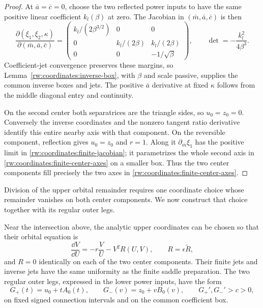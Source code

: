 \begin{proof}
At $\bar a=\bar c=0$, choose the two reflected power inputs to
have the same positive linear coefficient $k_l(\beta)$ at zero.
The Jacobian in $(\bar m,\bar a,\bar c)$ is then
\begin{equation}\label{rw:coordinates:finite-jacobian}
 \frac{\partial(\xi_1,\xi_2,\kappa)}
      {\partial(\bar m,\bar a,\bar c)}
 =\begin{pmatrix}
 k_l/(2\beta^{3/2})&0&0\\
 0&k_l/(2\beta)&k_l/(2\beta)\\
 0&0&-1/\sqrt\beta
 \end{pmatrix},\qquad
 \det=-\frac{k_l^2}{4\beta^3}.
\end{equation}
Coefficient-jet convergence preserves these margins, so
Lemma~\ref{rw:coordinates:inverse-box}, with $\beta$ and scale
passive, supplies the common inverse boxes and jets.
The positive $\bar a$ derivative at fixed $\kappa$ follows from
the middle diagonal entry and continuity.

On the second center both separatrices are the triangle sides, so
$u_0=z_0=0$. Conversely the inverse coordinates and the nonzero tangent
ratio derivative identify this entire nearby axis with that component.
On the reversible component, reflection gives $u_0=z_0$ and $r=1$.
Along it $\partial_{\bar m}\xi_1$ has the positive limit in
\eqref{rw:coordinates:finite-jacobian}; it parametrizes the whole
second axis in \eqref{rw:coordinates:finite-center-axes} on a smaller
box. Thus the two center components fill precisely the two axes in
\eqref{rw:coordinates:finite-center-axes}.
\end{proof}

Division of the upper orbital remainder requires one coordinate choice
whose remainder vanishes on both center components. We now construct
that choice together with its regular outer legs.

\begin{lemma}
\label{rw:coordinates:two-center-upper}
Near the intersection above, the analytic upper coordinates can be
chosen so that their orbital equation is
\[
 \frac{\dd V}{\dd U}=-r\frac VU-V^2R(U,V),\qquad
 R=\epsilon\widetilde R,
\]
and $R=0$ identically on each of the two center components. Their
finite jets and inverse jets have the same uniformity as the finite
saddle preparation. The two regular outer legs, expressed in the lower
power inputs, have the form
\[
 G_+(t)=u_0+tA_0(t),\qquad
 G_-(v)=z_0+vB_0(v),\qquad G_+',G_-'>c>0,
\]
on fixed signed connection intervals and on the common coefficient box.
\end{lemma}

